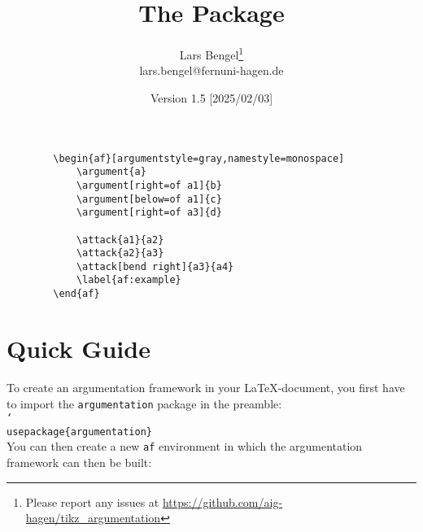 \documentclass{scrartcl}
\title{The \argumentation Package}
\author{Lars Bengel\footnote{Please report any issues at \url{https://github.com/aig-hagen/tikz_argumentation}}\\\small lars.bengel@fernuni-hagen.de}
\date{Version 1.5 [2025/02/03]}
\newcommand{\argumentation}{\texttt{argumentation}\xspace}
\DeclareRobustCommand\cs[2][-1.6cm]{\hspace{#1}\texttt{\char`\\#2}}
\begin{document}
\maketitle

\begin{minipage}{.26\textwidth}
    \centering
        \begin{af}[argumentstyle=gray,namestyle=monospace]
    
            \label{af:example}
        \end{af}
\end{minipage}
\begin{minipage}{.5\textwidth}
    \begin{small}
    \begin{verbatim}
        \begin{af}[argumentstyle=gray,namestyle=monospace]
            \argument{a}
            \argument[right=of a1]{b}
            \argument[below=of a1]{c}
            \argument[right=of a3]{d}
    
            \attack{a1}{a2}
            \attack{a2}{a3}
            \attack[bend right]{a3}{a4}
            \label{af:example}
        \end{af}
    \end{verbatim}
    \end{small}
\end{minipage}


\tableofcontents
\newpage

\section{Quick Guide}\label{sec:quick}
\noindent
To create an argumentation framework in your \LaTeX-document, you first have to import the \argumentation package in the preamble:\\

\noindent\cs[0cm]{usepackage\{argumentation\}}\\

You can then create a new \texttt{af} environment in which the argumentation framework can then be built:\\
\end{document}
